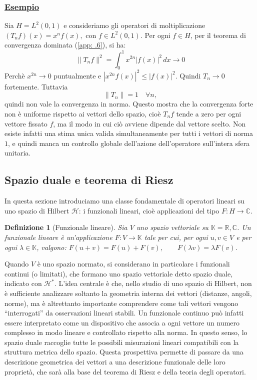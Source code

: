 \documentclass[a4paper,12pt]{report}
\newtheorem{definizione}{Definizione}[chapter]
\begin{document}
\subsubsection{\underline{Esempio}}

Sia $H=L^2(0,1)$ e consideriamo gli operatori di moltiplicazione $(T_n f)(x)=x^n f(x),$ con $ f\in L^2(0,1)$. Per ogni $f\in H$, per il teorema di convergenza dominata (\ref{app: .6}), si ha:
\[\|T_n f\|^2=\int_0^1 x^{2n}|f(x)|^2\,dx \to 0\]
Perchè $x^{2n}\to 0$ puntualmente e $|x^{2n}f(x)|^2\le |f(x)|^2$.  
Quindi $T_n \to 0$ fortemente. Tuttavia
\[
\|T_n\|=1 \quad \forall n,
\]
quindi non vale la convergenza in norma. Questo mostra che la convergenza forte non è uniforme rispetto ai vettori dello spazio, cioè $T_n f$ tende a zero per ogni vettore fissato $f$, ma il modo in cui ciò avviene dipende dal vettore scelto. Non esiste infatti una stima unica valida simultaneamente per tutti i vettori di norma $1$, e quindi manca un controllo globale dell’azione dell’operatore sull’intera sfera unitaria.

\newpage

\subsection{Spazio duale e teorema di Riesz}

In questa sezione introduciamo una classe fondamentale di operatori lineari su uno spazio di Hilbert $\mathscr{H}$: i funzionali lineari, cioè applicazioni del tipo $F: H \to \mathbb{C}$.

\begin{definizione}[Funzionale lineare]
Sia $V$ uno spazio vettoriale su $\mathbb{K}=\mathbb{R}, \mathbb{C}$. Un funzionale lineare è un’applicazione $F: V \to \mathbb{K}$ tale per cui, per ogni $u,v \in V$ e per ogni $\lambda \in \mathbb{K}$, valgono: $F(u+v)=F(u)+F(v), \qquad F(\lambda v)=\lambda F(v)$.

\end{definizione}

Quando $V$ è uno spazio normato, si considerano in particolare i funzionali continui (o limitati), che formano uno spazio vettoriale detto spazio duale, indicato con $\mathscr{H}^*$. L’idea centrale è che, nello studio di uno spazio di Hilbert, non è sufficiente analizzare soltanto la geometria interna dei vettori (distanze, angoli, norme), ma è altrettanto importante comprendere come tali vettori vengono “interrogati” da osservazioni lineari stabili. Un funzionale continuo può infatti essere interpretato come un dispositivo che associa a ogni vettore un numero complesso in modo lineare e controllato rispetto alla norma. In questo senso, lo spazio duale raccoglie tutte le possibili misurazioni lineari compatibili con la struttura metrica dello spazio. Questa prospettiva permette di passare da una descrizione geometrica dei vettori a una descrizione funzionale delle loro proprietà, che sarà alla base del teorema di Riesz e della teoria degli operatori.
\end{document}
